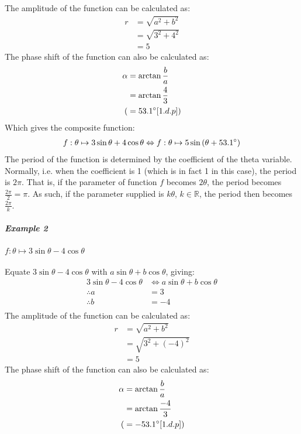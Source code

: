 \documentclass{article}
\begin{document}
        The amplitude of the function can be calculated as:
		\begin{align*}
			r &= \sqrt{a^2 + b^2} \\
			&= \sqrt{3^2 + 4^2} \\
			&= 5
		\end{align*}
		The phase shift of the function can also be calculated as:
		\begin{align*}
			\alpha &= \arctan{\frac{b}{a}} \\
			&= \arctan{\frac{4}{3}} \\
			(&= 53.1\degree [1.d.p]) 
		\end{align*}
        Which gives the composite function:
        \begin{align*}
            f:\theta \mapsto 3\sin{\theta} + 4\cos{\theta} \Leftrightarrow f:\theta \mapsto 5\sin{(\theta + 53.1\degree)}
        \end{align*}
		The period of the function is determined by the coefficient of the theta variable. Normally, i.e. when the coefficient is 1 (which is in fact 1 in this case), the period is $2\pi$. That is, if the parameter of function $f$ becomes $2\theta$, the period becomes $\frac{2\pi}{2} = \pi$. As such, if the parameter supplied is $k\theta$, $k \in \mathbb{R}$, the period then becomes $\frac{2\pi}{k}$. \\
		\subparagraph{Example 2} $f:\theta \mapsto 3\sin{\theta} - 4\cos{\theta}$ \\\\
		Equate $3\sin{\theta} - 4\cos{\theta}$ with $a\sin{\theta} + b\cos{\theta}$, giving:
		\begin{align*}
		3\sin{\theta} - 4\cos{\theta} &\Leftrightarrow a\sin{\theta} + b\cos{\theta} \\
		\therefore a &= 3 \\
		\therefore b &= -4 \\
		\end{align*}
		The amplitude of the function can be calculated as:
		\begin{align*}
		r &= \sqrt{a^2 + b^2} \\
		&= \sqrt{3^2 + (-4)^2} \\
		&= 5
		\end{align*}
		The phase shift of the function can also be calculated as:
		\begin{align*}
		\alpha &= \arctan{\frac{b}{a}} \\
		&= \arctan{\frac{-4}{3}} \\
		(&= -53.1\degree [1.d.p]) 
		\end{align*}
\end{document}

